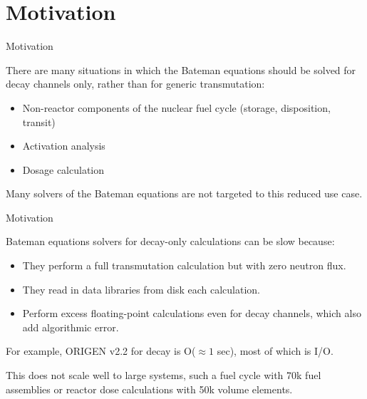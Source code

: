 \documentclass[xcolor=x11names,compress]{beamer}
\begin{document}
\section{Motivation}
\begin{frame}{Motivation}

    There are many situations in which the Bateman equations 
    \cite{bateman1910solution} should be solved for decay channels only, 
    rather than for generic transmutation:
    
    \vspace*{1em}
    \begin{itemize}
        \item Non-reactor components of the nuclear fuel cycle (storage, 
              disposition, transit)
        \item Activation analysis
        \item Dosage calculation
    \end{itemize}

    \vspace*{1em}
    Many solvers of the Bateman equations are not targeted to this reduced 
    use case.

\end{frame}

\begin{frame}{Motivation}

    Bateman equations solvers for decay-only calculations can be slow because:
    
    \vspace*{1em}
    \begin{itemize}
        \item They perform a full transmutation calculation but with zero
              neutron flux.
        \item They read in data libraries from disk each calculation.
        \item Perform excess floating-point calculations even for decay
              channels, which also add algorithmic error.
    \end{itemize}

    For example, ORIGEN v2.2 \cite{croff1980origen2} for decay is 
    O($\approx 1$ sec), most of which is I/O.

    \vspace*{1em}
    This does not scale well to large systems, such a fuel cycle with 70k 
    fuel assemblies or reactor dose calculations with 50k volume elements.

\end{frame}
\end{document}

